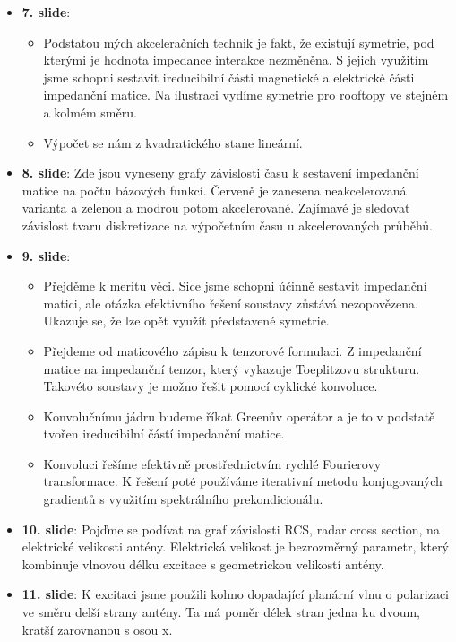 \documentclass[12pt]{article}
\begin{document}
\begin{itemize}
        \item \textbf{7. slide}:
            \begin{itemize}
                \item Podstatou mých akceleračních technik je fakt, že existují symetrie, pod kterými je hodnota impedance interakce nezměněna. S jejich využitím jsme schopni sestavit ireducibilní části magnetické a elektrické části impedanční matice. Na ilustraci vydíme symetrie pro rooftopy ve stejném a kolmém směru.
                \item Výpočet se nám z kvadratického stane lineární.
            \end{itemize}
        \item \textbf{8. slide}: Zde jsou vyneseny grafy závislosti času k sestavení impedanční matice na počtu bázových funkcí. Červeně je zanesena neakcelerovaná varianta a zelenou a modrou potom akcelerované. Zajímavé je sledovat závislost tvaru diskretizace na výpočetním času u akcelerovaných průběhů.
        \item \textbf{9. slide}: 
            \begin{itemize}
                \item Přejděme k meritu věci. Sice jsme schopni účinně sestavit impedanční matici, ale otázka efektivního řešení soustavy zůstává nezopovězena. Ukazuje se, že lze opět využít představené symetrie. 
                \item Přejdeme od maticového zápisu k tenzorové formulaci. Z impedanční matice na impedanční tenzor, který vykazuje Toeplitzovu strukturu. Takovéto soustavy je možno řešit pomocí cyklické konvoluce.
                \item Konvolučnímu jádru budeme říkat Greenův operátor a je to v podstatě tvořen ireducibilní částí impedanční matice.
                \item Konvoluci řešíme efektivně prostřednictvím rychlé Fourierovy transformace. K řešení poté používáme iterativní metodu konjugovaných gradientů s využitím spektrálního prekondicionálu.
            \end{itemize}
        \item \textbf{10. slide}: Pojďme se podívat na graf závislosti RCS, radar cross section, na elektrické velikosti antény. Elektrická velikost je bezrozměrný parametr, který kombinuje vlnovou délku excitace s geometrickou velikostí antény.
        \item \textbf{11. slide}: K excitaci jsme použili kolmo dopadající planární vlnu o polarizaci ve směru delší strany antény. Ta má poměr délek stran jedna ku dvoum, kratší zarovnanou s osou x.

\end{itemize}
\end{document}
